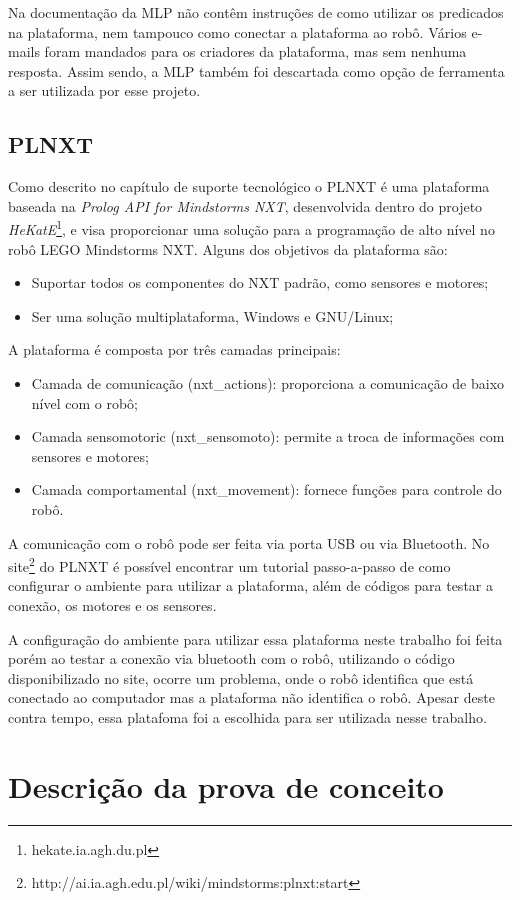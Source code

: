 Na documentação da MLP não contêm instruções de como utilizar os predicados na plataforma, nem tampouco como conectar a plataforma ao robô. Vários e-mails foram mandados para os criadores da plataforma, mas sem nenhuma resposta. Assim sendo, a MLP também foi descartada como opção de ferramenta a ser utilizada por esse projeto.

\subsection[PLNXT]{PLNXT}
Como descrito no capítulo de suporte tecnológico o PLNXT é uma plataforma baseada na \textit{Prolog API for Mindstorms NXT}, desenvolvida dentro do projeto \textit{HeKatE}\footnote{hekate.ia.agh.du.pl}, e visa proporcionar uma solução para a programação de alto nível no robô LEGO Mindstorms NXT. Alguns dos objetivos da plataforma são:
\begin{itemize}
\item Suportar todos os componentes do NXT padrão, como sensores e motores;
\item Ser uma solução multiplataforma, Windows e GNU/Linux;
\end{itemize}
A plataforma é composta por três camadas principais:
\begin{itemize}
\item Camada de comunicação (nxt\_actions): proporciona a comunicação de baixo nível com o robô;
\item Camada sensomotoric (nxt\_sensomoto): permite a troca de informações com sensores e motores;
\item Camada comportamental (nxt\_movement): fornece funções para controle do robô.
\end{itemize}
A comunicação com o robô pode ser feita via porta USB ou via Bluetooth. No site\footnote{http://ai.ia.agh.edu.pl/wiki/mindstorms:plnxt:start} do PLNXT é possível encontrar um tutorial passo-a-passo de como configurar o ambiente para utilizar a plataforma, além de códigos para testar a conexão, os motores e os sensores.

A configuração do ambiente para utilizar essa plataforma neste trabalho foi feita porém ao testar a conexão via bluetooth com o robô, utilizando o código disponibilizado no site, ocorre um problema, onde o robô identifica que está conectado ao computador mas a plataforma não identifica o robô. Apesar deste contra tempo, essa platafoma foi a escolhida para ser utilizada nesse trabalho.

\section{Descrição da prova de conceito}
